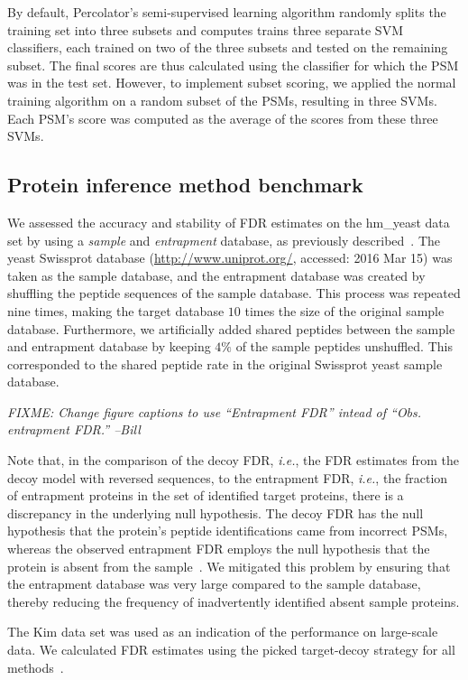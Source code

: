\documentclass{article}
\begin{document}
By default, Percolator's semi-supervised learning algorithm randomly
splits the training set into three subsets and computes trains three
separate SVM classifiers, each trained on two of the three subsets and
tested on the remaining subset.  The final scores are thus calculated
using the classifier for which the PSM was in the test set. However,
to implement subset scoring, we applied the normal training algorithm
on a random subset of the PSMs, resulting in three SVMs.  Each PSM's
score was computed as the average of the scores from these three SVMs.

\subsection*{Protein inference method benchmark}

We assessed the accuracy and stability of FDR estimates on the
hm\_yeast data set by using a {\em sample} and {\em entrapment}
database, as previously described~\cite{granholm2013determining}. The
yeast Swissprot database (\url{http://www.uniprot.org/}, accessed:
2016 Mar 15) was taken as the sample database, and the entrapment
database was created by shuffling the peptide sequences of the sample
database. This process was repeated nine times, making the target
database $10$ times the size of the original sample database.
Furthermore, we artificially added shared peptides between the sample
and entrapment database by keeping $4\%$ of the sample peptides
unshuffled. This corresponded to the shared peptide rate in the
original Swissprot yeast sample database.

{\em FIXME: Change figure captions to use ``Entrapment FDR'' intead of
  ``Obs. entrapment FDR.'' --Bill}

Note that, in the comparison of the decoy FDR, {\em i.e.}, the FDR 
estimates from the decoy model with reversed sequences, to the 
entrapment FDR, {\em i.e.}, the fraction of entrapment proteins in the 
set of identified target proteins, there is a discrepancy in the 
underlying null hypothesis. The decoy FDR has the null hypothesis that 
the protein's peptide identifications came from incorrect PSMs, 
whereas the observed entrapment FDR employs the null hypothesis that 
the protein is absent from the sample~\cite{the:how}. We mitigated 
this problem by ensuring that the entrapment database was very large 
compared to the sample database, thereby reducing the frequency of 
inadvertently identified absent sample proteins.

The Kim data set was used as an indication of the performance on
large-scale data. We calculated FDR estimates
using the picked target-decoy strategy for all
methods~\cite{savitski2015scalable}.
\end{document}
